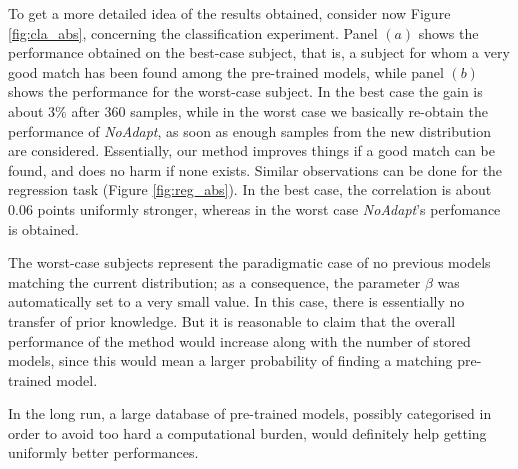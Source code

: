 To get a more detailed idea of the results obtained, consider now Figure \ref{fig:cla_abs},
concerning the classification experiment. Panel $(a)$ shows the
performance obtained on the best-case subject, that is, a subject for
whom a very good match has been found among the pre-trained models,
while panel $(b)$ shows the performance for the worst-case subject. In
the best case the gain is about $3\%$ after 360 samples, while
in the worst case we basically re-obtain the performance of
\emph{NoAdapt}, as soon as enough samples from the new distribution
are considered. Essentially, our method improves things if a good
match can be found, and does no harm if none exists.
Similar observations can be done for the regression task (Figure
\ref{fig:reg_abs}). In the best case, the correlation is about
0.06 points uniformly stronger, whereas in the
worst case \emph{NoAdapt}'s perfomance is obtained.

The worst-case subjects represent the paradigmatic case of no previous
models matching the current distribution; as a consequence, the
parameter $\beta$ was automatically set to a very small value. In this
case, there is essentially no transfer of prior knowledge. But it
is reasonable to claim that the overall performance of the method
would increase along with the number of stored models, since this
would mean a larger probability of finding a matching pre-trained
model.

In the long run, a large database of pre-trained models, possibly
categorised in order to avoid too hard a computational burden, would
definitely help getting uniformly better performances.
